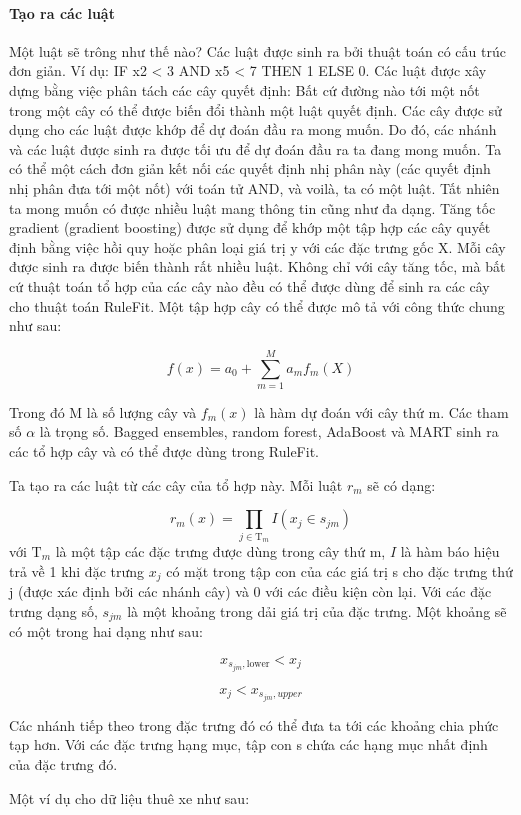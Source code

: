 \paragraph{Tạo ra các luật}
Một luật sẽ trông như thế nào? Các luật được sinh ra bởi thuật toán có cấu trúc đơn giản. Ví dụ: IF x2 < 3 AND x5 < 7 THEN 1 ELSE 0. Các luật được xây dựng bằng việc phân tách các cây quyết định: Bất cứ đường nào tới một nốt trong một cây có thể được biến đổi thành một luật quyết định. Các cây được sử dụng cho các luật được khớp để dự đoán đầu ra mong muốn. Do đó, các nhánh và các luật được sinh ra được tối ưu để dự đoán đầu ra ta đang mong muốn. Ta có thể một cách đơn giản kết nối các quyết định nhị phân này (các quyết định nhị phân đưa tới một nốt) với toán tử AND, và voilà, ta có một luật. Tất nhiên ta mong muốn có được nhiều luật mang thông tin cũng như đa dạng. Tăng tốc gradient (gradient boosting) được sử dụng để khớp một tập hợp các cây quyết định bằng việc hồi quy hoặc phân loại giá trị y với các đặc trưng gốc X. Mỗi cây được sinh ra được biến thành rất nhiều luật. Không chỉ với cây tăng tốc, mà bất cứ thuật toán tổ hợp của các cây nào đều có thể được dùng để sinh ra các cây cho thuật toán RuleFit. Một tập hợp cây có thể được mô tả với công thức chung như sau:

$$f(x)=a_0+\sum_{m=1}^M{}a_m{}f_m(X)$$

Trong đó M là số lượng cây và $f_m(x)$ là hàm dự đoán với cây thứ m. Các tham số $\alpha$ là trọng số. Bagged ensembles, random forest, AdaBoost và MART sinh ra các tổ hợp cây và có thể được dùng trong RuleFit.

Ta tạo ra các luật từ các cây của tổ hợp này. Mỗi luật $r_m$ sẽ có dạng:

$$r_m(x)=\prod_{j\in\text{T}_m}I(x_j\in{}s_{jm})$$
với $\text{T}_{m}$ là một tập các đặc trưng được dùng trong cây thứ m, $I$ là hàm báo hiệu trả về 1 khi đặc trưng $x_j$ có mặt trong tập con của các giá trị s cho đặc trưng thứ j (được xác định bởi các nhánh cây) và 0 với các điều kiện còn lại. Với các đặc trưng dạng số, $s_{jm}$ là một khoảng trong dải giá trị của đặc trưng. Một khoảng sẽ có một trong hai dạng như sau: 

$$x_{s_{jm},\text{lower}}<x_j$$

$$x_j<x_{s_{jm},upper}$$

Các nhánh tiếp theo trong đặc trưng đó có thể đưa ta tới các khoảng chia phức tạp hơn. Với các đặc trưng hạng mục, tập con s chứa các hạng mục nhất định của đặc trưng đó.

Một ví dụ cho dữ liệu thuê xe như sau:

